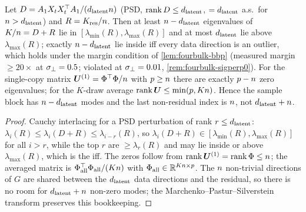 \begin{lemma}\label{lem:fourbulk-counts}
Let $D=A_1X_tX_t^\top A_1/(d_{\mathrm{latent}}n)$ (PSD, $\operatorname{rank}D\le d_{\mathrm{latent}}$, $=d_{\mathrm{latent}}$ a.s.\ for $n>d_{\mathrm{latent}}$) and $R=K_{\mathrm{res}}/n$. Then at least $n-d_{\mathrm{latent}}$ eigenvalues of $K/n=D+R$ lie in $[\lambda_{\min}(R),\lambda_{\max}(R)]$ and at most $d_{\mathrm{latent}}$ lie above $\lambda_{\max}(R)$; exactly $n-d_{\mathrm{latent}}$ lie inside iff every data direction is an outlier, which holds under the margin condition of \cref{lem:fourbulk-bbp} (measured margin $\ge20\times$ at $\sigma_{\perp}=0.5$; violated at $\sigma_{\perp}=0.01$, \cref{rem:fourbulk-sigperp0}). For the single-copy matrix $\bm{U}^{(1)}=\Phi^\top\Phi/n$ with $p\ge n$ there are exactly $p-n$ zero eigenvalues; for the $K$-draw average $\operatorname{rank}\bm{U}\le\min(p,Kn)$. Hence the sample block has $n-d_{\mathrm{latent}}$ modes and the last non-residual index is $n$, not $d_{\mathrm{latent}}+n$.
\end{lemma}
\begin{proof}
Cauchy interlacing for a PSD perturbation of rank $r\le d_{\mathrm{latent}}$: $\lambda_{i}(R)\le\lambda_{i}(D+R)\le\lambda_{i-r}(R)$, so $\lambda_i(D+R)\in[\lambda_{\min}(R),\lambda_{\max}(R)]$ for all $i>r$, while the top $r$ are $\ge\lambda_r(R)$ and may lie inside or above $\lambda_{\max}(R)$, which is the iff. The zeros follow from $\operatorname{rank}\bm{U}^{(1)}=\operatorname{rank}\Phi\le n$; the averaged matrix is $\Phi_{\mathrm{all}}^\top\Phi_{\mathrm{all}}/(Kn)$ with $\Phi_{\mathrm{all}}\in\mathbb{R}^{Kn\times p}$. The $n$ non-trivial directions of $G$ are shared between the $d_{\mathrm{latent}}$ data directions and the residual, so there is no room for $d_{\mathrm{latent}}+n$ non-zero modes; the Marchenko--Pastur--Silverstein transform preserves this bookkeeping.
\end{proof}

